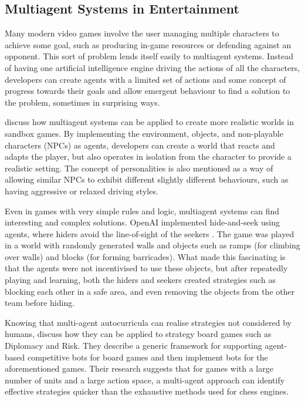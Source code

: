 \documentclass[conference]{IEEEtran}
\begin{document}
\subsection{Multiagent Systems in Entertainment}

Many modern video games involve the user managing multiple characters to achieve some goal, such as producing in-game resources or defending against an opponent. This sort of problem lends itself easily to multiagent systems. Instead of having one artificial intelligence engine driving the actions of all the characters, developers can create agents with a limited set of actions and some concept of progress towards their goals and allow emergent behaviour to find a solution to the problem, sometimes in surprising ways. 

\cite{sandboxmas} discuss how multiagent systems can be applied to create more realistic worlds in sandbox games. By implementing the environment, objects, and non-playable characters (NPCs) as agents, developers can create a world that reacts and adapts the player, but also operates in isolation from the character to provide a realistic setting. The concept of personalities is also mentioned as a way of allowing similar NPCs to exhibit different slightly different behaviours, such as having aggressive or relaxed driving styles.

Even in games with very simple rules and logic, multiagent systems can find interesting and complex solutions. OpenAI implemented hide-and-seek using agents, where hiders avoid the line-of-sight of the seekers \cite{openaiemergent}. The game was played in a world with randomly generated walls and objects such as ramps (for climbing over walls) and blocks (for forming barricades). What made this fascinating is that the agents were not incentivised to use these objects, but after repeatedly playing and learning, both the hiders and seekers created strategies such as blocking each other in a safe area, and even removing the objects from the other team before hiding.

Knowing that multi-agent autocurricula can realise strategies not considered by humans, \cite{masboardgames} discuss how they can be applied to strategy board games such as Diplomacy and Risk. They describe a generic framework for supporting agent-based competitive bots for board games and then implement bots for the aforementioned games. Their research suggests that for games with a large number of units and a large action space, a multi-agent approach can identify effective strategies quicker than the exhaustive methods used for chess engines. 
\end{document}
